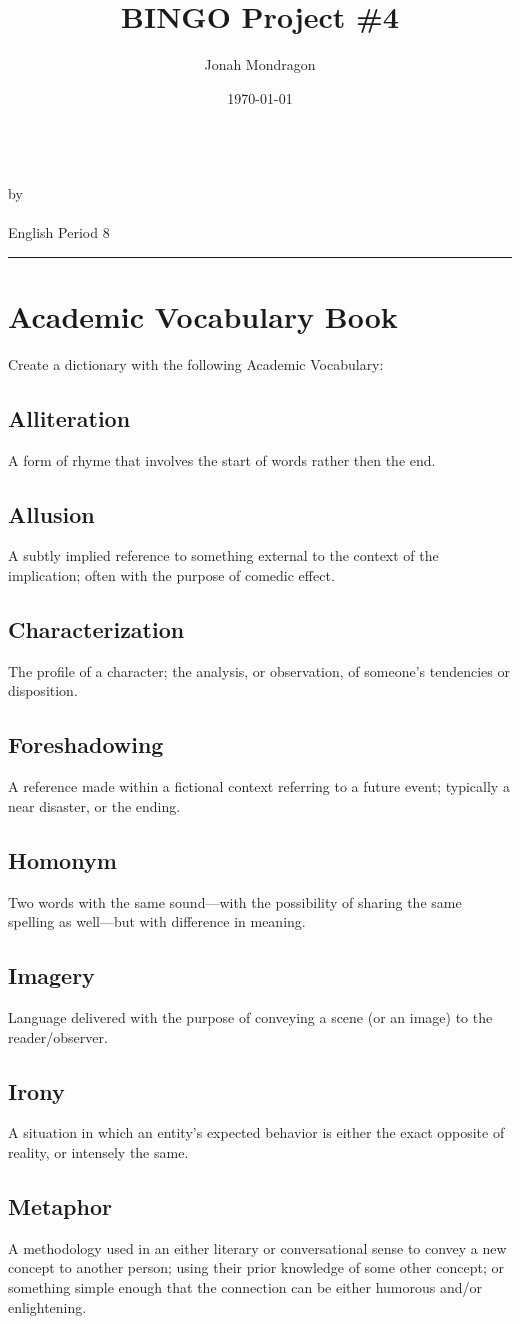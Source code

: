 \documentclass{article}
\title{BINGO Project \#4}
\author{Jonah Mondragon}
\date{\today}
\newcommand{\PutTitle}[1]
{
    \begin{center}
        {\huge\bfseries\thetitle}\\
        by \theauthor\\
        \thedate\\
        #1        
    \end{center}
    \hrule
    \vspace{2ex}
}
\begin{document}
\PutTitle{English Period 8}
\pagestyle{headings}
\thispagestyle{empty}

\section{Academic Vocabulary Book}
Create a dictionary with the following Academic Vocabulary:
\begin{addmargin}[0.5in]{0in}
    \subsection*{Alliteration}
        A form of rhyme that involves the start of words rather then the end.
    \subsection*{Allusion}
        A subtly implied reference to something external to the context of the implication; often with the purpose of comedic
        effect.
    \subsection*{Characterization}
        The profile of a character; the analysis, or observation, of someone's tendencies or disposition.
    \subsection*{Foreshadowing}
        A reference made within a fictional context referring to a future event; typically a near disaster, or the ending. 
    \subsection*{Homonym}
        Two words with the same sound---with the possibility of sharing the same spelling as well---but with difference in
        meaning.
    \subsection*{Imagery} 
        Language delivered with the purpose of conveying a scene (or an image) to the reader/observer.
    \subsection*{Irony}
        A situation in which an entity's expected behavior is either the exact opposite of reality, or intensely the same.
    \subsection*{Metaphor}
        A methodology used in an either literary or conversational sense to convey a new concept to another person; using 
        their prior knowledge of some other concept; or something simple enough that the connection can be either humorous
        and/or enlightening.

\end{addmargin}
\end{document}
